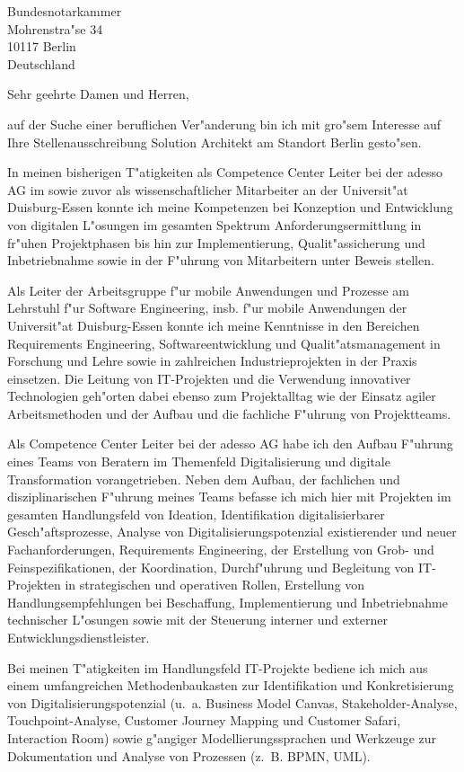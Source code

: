 \documentclass[11pt,a4paper]{dinbrief}
\date{\today}
\begin{document}
 
\begin{letter}  
{%
	Bundesnotarkammer\\
	Mohrenstra"se 34\\
	10117 Berlin\\
	Deutschland
}
\subject{\bf Bewerbung Solution Architekt}
\opening{Sehr geehrte Damen und Herren,}
auf der Suche einer beruflichen Ver"anderung bin ich mit gro"sem Interesse auf Ihre Stellenausschreibung Solution Architekt am Standort Berlin  gesto"sen. 

In meinen bisherigen T"atigkeiten als Competence Center Leiter bei der adesso AG im sowie zuvor als wissenschaftlicher Mitarbeiter an der Universit"at Duisburg-Essen konnte ich meine Kompetenzen bei Konzeption und Entwicklung von digitalen L"osungen im gesamten Spektrum Anforderungsermittlung in fr"uhen Projektphasen bis hin zur Implementierung, Qualit"assicherung und Inbetriebnahme sowie in der F"uhrung von Mitarbeitern unter Beweis stellen.

Als Leiter der Arbeitsgruppe f"ur mobile Anwendungen und Prozesse am Lehrstuhl f"ur Software Engineering, insb. f"ur mobile Anwendungen der Universit"at Duisburg-Essen konnte ich meine Kenntnisse in den Bereichen Requirements Engineering, Softwareentwicklung  und Qualit"atsmanagement in Forschung und Lehre sowie in zahlreichen Industrieprojekten in der Praxis einsetzen. Die Leitung von IT-Projekten und die Verwendung innovativer Technologien geh"orten dabei ebenso zum Projektalltag wie der Einsatz agiler Arbeitsmethoden und der Aufbau und die fachliche  F"uhrung von Projektteams.

Als Competence Center Leiter bei der adesso AG habe ich den Aufbau F"uhrung eines Teams von Beratern im Themenfeld Digitalisierung und digitale Transformation vorangetrieben. Neben dem Aufbau, der fachlichen und disziplinarischen F"uhrung meines Teams befasse ich mich hier mit Projekten im gesamten Handlungsfeld von Ideation, Identifikation digitalisierbarer Gesch"aftsprozesse, Analyse von Digitalisierungspotenzial existierender und neuer Fachanforderungen, Requirements Engineering, der Erstellung von Grob- und Feinspezifikationen, der Koordination, Durchf"uhrung und Begleitung von IT-Projekten in strategischen und operativen Rollen, Erstellung von Handlungsempfehlungen bei Beschaffung, Implementierung und Inbetriebnahme technischer L"osungen sowie mit der Steuerung interner und externer Entwicklungsdienstleister. 

Bei meinen T"atigkeiten im Handlungsfeld IT-Projekte bediene ich mich aus einem umfangreichen Methodenbaukasten zur Identifikation und Konkretisierung von Digitalisierungspotenzial (u.~a. Business Model Canvas, Stakeholder-Analyse, Touchpoint-Analyse, Customer Journey Mapping und Customer Safari, Interaction Room) sowie g"angiger Modellierungssprachen und Werkzeuge zur Dokumentation und Analyse von Prozessen (z.~B. BPMN, UML).


\end{letter}
\end{document}
